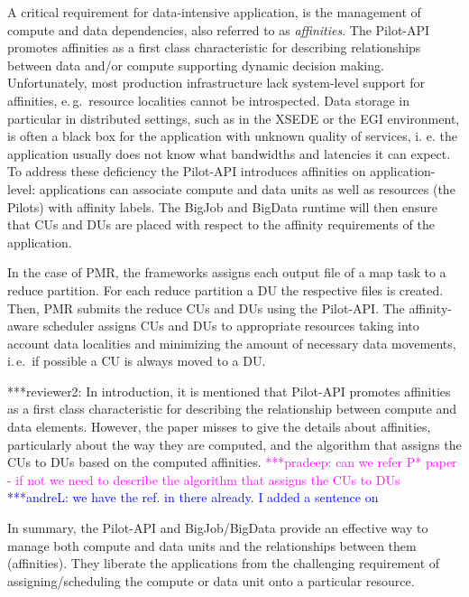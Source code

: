 \documentclass{acm_proc_article-sp}
\newcommand{\alnote}[1]{ {\textcolor{blue} { ***andreL: #1 }}}
\newcommand{\pnote}[1]{ {\textcolor{magenta} { ***pradeep: #1 }}}
\newcommand{\secrev}[1]{ {\textcolor{Bittersweet} { ***reviewer2: #1 }}}
\newcommand{\alnote}[1]{}
\newcommand{\pnote}[1]{}
\newcommand{\pilots}{Pilots\xspace}
\begin{document}
A critical requirement for data-intensive application, is the management
of compute and data dependencies, also referred to as {\it affinities}. 
The Pilot-API promotes affinities as a first class
characteristic for describing relationships between data and/or
compute supporting dynamic decision making. Unfortunately, most
production infrastructure lack system-level support for affinities,
e.\,g.\ resource localities cannot be introspected. Data storage in
particular in distributed settings, such as in the XSEDE or the EGI
environment, is often a black box for the application with unknown
quality of services, i. e. the application usually does not know what
bandwidths and latencies it can expect. To address these deficiency
the Pilot-API introduces affinities on application-level: applications
can associate compute and data units as well as resources (the
\pilots) with affinity labels. The BigJob and BigData runtime will
then ensure that CUs and DUs are placed with respect to the affinity
requirements of the application. 

In the case of PMR, the frameworks assigns each output file of a map task to a
reduce partition. For each reduce partition a DU the respective files is
created. Then, PMR submits the reduce CUs and DUs using the Pilot-API. The
affinity-aware scheduler assigns CUs and DUs to appropriate resources taking
into account data localities and minimizing the amount of necessary data
movements, i.\,e.\ if possible a CU is always moved to a DU.

\secrev{ In introduction, it is mentioned that Pilot-API promotes affinities as
a first class characteristic for describing the relationship between compute and
data elements. However, the paper misses to give the details about affinities,
particularly about the way they are computed, and the algorithm that assigns the
CUs to DUs based on the computed affinities.} \pnote{can we refer P* paper - if
not we need to describe the algorithm that assigns the CUs to DUs} \alnote{we
have the ref. in there already. I added a sentence on }



In summary, the Pilot-API and BigJob/BigData provide an effective way to manage both
compute and data units and the relationships between them
(affinities). They liberate the applications from the challenging
requirement of assigning/scheduling the compute or data unit onto a
particular resource.
\end{document}
